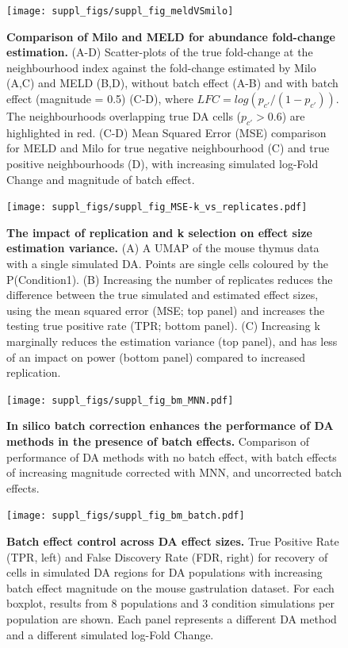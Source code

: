 \documentclass[
]{article}
\begin{document}
\begin{figure}
\texttt{[image: suppl\_figs/suppl\_fig\_meldVSmilo]} \caption{\textbf{Comparison of Milo and MELD for abundance fold-change estimation.} (A-D) Scatter-plots of the true fold-change at the neighbourhood index against the fold-change estimated by Milo (A,C) and MELD (B,D), without batch effect (A-B) and with batch effect (magnitude = 0.5) (C-D), where \(LFC = log(p_{c'}/(1 - p_{c'}))\). The neighbourhoods overlapping true DA cells (\(p_{c'}>0.6\)) are highlighted in red. (C-D) Mean Squared Error (MSE) comparison for MELD and Milo for true negative neighbourhood (C) and true positive neighbourhoods (D), with increasing simulated log-Fold Change and magnitude of batch effect.}\label{fig:sup-fig-bm-meld}
\end{figure}



\begin{figure}
\centering
\texttt{[image: suppl\_figs/suppl\_fig\_MSE-k\_vs\_replicates.pdf]}
\caption{\label{fig:sup-fig-msek}\textbf{The impact of replication and k selection on effect size estimation variance.} (A) A UMAP of the mouse thymus data with a single simulated DA. Points are single cells coloured by the P(Condition1). (B) Increasing the number of replicates reduces the difference between the true simulated and estimated effect sizes, using the mean squared error (MSE; top panel) and increases the testing true positive rate (TPR; bottom panel). (C) Increasing k marginally reduces the estimation variance (top panel), and has less of an impact on power (bottom panel) compared to increased replication.}
\end{figure}



\begin{figure}
\centering
\texttt{[image: suppl\_figs/suppl\_fig\_bm\_MNN.pdf]}
\caption{\label{fig:sup-fig-bm-mnn}\textbf{In silico batch correction enhances the performance of DA methods in the presence of batch effects.} Comparison of performance of DA methods with no batch effect, with batch effects of increasing magnitude corrected with MNN, and uncorrected batch effects.}
\end{figure}



\begin{figure}
\centering
\texttt{[image: suppl\_figs/suppl\_fig\_bm\_batch.pdf]}
\caption{\label{fig:sup-fig-bm-batch}\textbf{Batch effect control across DA effect sizes.} True Positive Rate (TPR, left) and False Discovery Rate (FDR, right) for recovery of cells in simulated DA regions for DA populations with increasing batch effect magnitude on the mouse gastrulation dataset. For each boxplot, results from 8 populations and 3 condition simulations per population are shown. Each panel represents a different DA method and a different simulated log-Fold Change.}
\end{figure}
\end{document}
